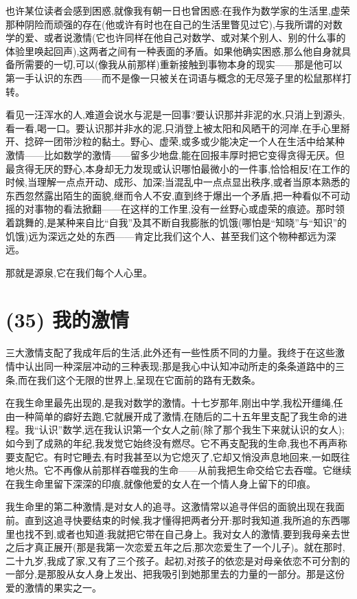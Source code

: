 也许某位读者会感到困惑,就像我有朝一日也曾困惑:在我作为数学家的生活里,虚荣那种阴险而顽强的存在(他或许有时也在自己的生活里瞥见过它),与我所谓的对数学的爱、或者说激情(它也许同样在他自己对数学、或对某个别人、别的什么事的体验里唤起回声),这两者之间有一种表面的矛盾。如果他确实困惑,那么他自身就具备所需要的一切,可以(像我从前那样)重新接触到事物本身的现实——那是他可以第一手认识的东西——而不是像一只被关在词语与概念的无尽笼子里的松鼠那样打转。

看见一汪浑水的人,难道会说水与泥是一回事?要认识那并非泥的水,只消上到源头,看一看,喝一口。要认识那并非水的泥,只消登上被太阳和风晒干的河岸,在手心里掰开、捻碎一团带沙粒的黏土。野心、虚荣,或多或少能决定一个人在生活中给某种激情——比如数学的激情——留多少地盘,能在回报丰厚时把它变得贪得无厌。但最贪得无厌的野心,本身却无力发现或认识哪怕最微小的一件事,恰恰相反!在工作的时候,当理解一点点开动、成形、加深;当混乱中一点点显出秩序,或者当原本熟悉的东西忽然露出陌生的面貌,继而令人不安,直到终于爆出一个矛盾,把一种看似不可动摇的对事物的看法掀翻——在这样的工作里,没有一丝野心或虚荣的痕迹。那时领着跳舞的,是某种来自比“自我”及其不断自我膨胀的饥饿(哪怕是“知晓”与“知识”的饥饿)远为深远之处的东西——肯定比我们这个人、甚至我们这个物种都远为深远。

那就是源泉,它在我们每个人心里。

\section{(35) 我的激情}

三大激情支配了我成年后的生活,此外还有一些性质不同的力量。我终于在这些激情中认出同一种深层冲动的三种表现;那是我心中认知冲动所走的条条道路中的三条,而在我们这个无限的世界上,呈现在它面前的路有无数条。

在我生命里最先出现的,是我对数学的激情。十七岁那年,刚出中学,我松开缰绳,任由一种简单的癖好去跑,它就展开成了激情,在随后的二十五年里支配了我生命的进程。我“认识”数学,远在我认识第一个女人之前(除了那个我生下来就认识的女人);如今到了成熟的年纪,我发觉它始终没有燃尽。它不再支配我的生命,我也不再声称要支配它。有时它睡去,有时我甚至以为它熄灭了,它却又悄没声息地回来,一如既往地火热。它不再像从前那样吞噬我的生命——从前我把生命交给它去吞噬。它继续在我生命里留下深深的印痕,就像他爱的女人在一个情人身上留下的印痕。

我生命里的第二种激情,是对女人的追寻。这激情常以追寻伴侣的面貌出现在我面前。直到这追寻快要结束的时候,我才懂得把两者分开:那时我知道,我所追的东西哪里也找不到,或者也知道:我就把它带在自己身上。我对女人的激情,要到我母亲去世之后才真正展开(那是我第一次恋爱五年之后,那次恋爱生了一个儿子)。就在那时,二十九岁,我成了家,又有了三个孩子。起初,对孩子的依恋是对母亲依恋不可分割的一部分,是那股从女人身上发出、把我吸引到她那里去的力量的一部分。那是这份爱的激情的果实之一。

